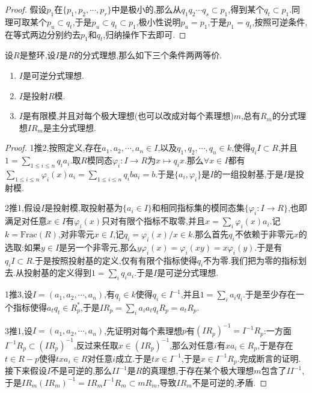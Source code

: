\begin{enumerate}
\begin{proof}
		假设$p_1$在$\{p_1,p_2,\cdots,p_r\}$中是极小的,那么从$q_1q_2\cdots q_s\subset p_1$,得到某个$q_t\subset p_1$.同理可取某个$p_u\subset q_t$,于是$p_u\subset q_t\subset p_1$,极小性说明$p_u=p_1$,于是$p_1=q_t$,按照可逆条件,在等式两边分别约去$p_1$和$q_t$,归纳操作下去即可.
	\end{proof}
\end{enumerate}

设$R$是整环,设$I$是$R$的分式理想,那么如下三个条件两两等价.
\begin{enumerate}
	\item $I$是可逆分式理想.
	\item $I$是投射$R$模.
	\item $I$是有限模,并且对每个极大理想(也可以改成对每个素理想)$m$,总有$R_m$的分式理想$IR_m$是主分式理想.
\end{enumerate}
\begin{proof}
	
	1推2,按照定义,存在$a_1,a_2,\cdots,a_n\in I$,以及$q_1,q_2,\cdots,q_n\in k$,使得$q_iI\subset R$,并且$1=\sum_{1\le i\le n}q_ia_i$.取$R$模同态$\varphi_i:I\to R$为$x\mapsto q_ix$.那么$\forall x\in I$都有$\sum_{1\le i\le n}\varphi_i(x)a_i=\sum_{1\le i\le n}q_iba_i=b$.于是$\{a_i,\varphi_i\}$是$I$的一组投射基,于是$I$是投射模.
	
	2推1,假设$I$是投射模,取投射基为$\{a_i\in I\}$和相同指标集的模同态集$\{\varphi_i:I\to R\}$,也即满足对任意$x\in I$有$\varphi_i(x)$只对有限个指标不取零,并且$x=\sum_i\varphi_i(x)a_i$.记$k=\mathrm{Frac}(R)$,对非零元$x\in I$,记$q_i=\varphi_i(x)/x\in k$.那么首先$q_i$不依赖于非零元$x$的选取:如果$y\in I$是另一个非零元,那么$y\varphi_i(x)=\varphi_i(xy)=x\varphi_i(y)$.于是有$q_iI\subset R$.于是按照投射基的定义,仅有有限个指标使得$q_i$不为零.我们把为零的指标划去.从投射基的定义得到$1=\sum_iq_ia_i$.于是$I$是可逆分式理想.
	
	1推3,设$I=(a_1,a_2,\cdots,a_n)$,有$q_i\in k$使得$q_i\in I^{-1}$,并且$1=\sum_ia_iq_i$.于是至少存在一个指标使得$a_tq_t\in R_p^*$,于是$IR_p=\sum_ia_ia_tq_tR_p=a_tR_p$.
	
	3推1,设$I=(a_1,a_2,\cdots,a_n)$,先证明对每个素理想$p$有$(IR_p)^{-1}=I^{-1}R_p$:一方面$I^{-1}R_p\subset(IR_p)^{-1}$,反过来任取$x\in(IR_p)^{-1}$,那么对任意$i$有$xa_i\in R_p$,于是存在$t\in R-p$使得$txa_i\in R$对任意$i$成立.于是$tx\in I^{-1}$,于是$x\in I^{-1}R_p$.完成断言的证明.接下来假设$I$不是可逆的,那么$II^{-1}$是$R$的真理想,于存在某个极大理想$m$包含了$II^{-1}$,于是$IR_m(IR_m)^{-1}=IR_mI^{-1}R_m\subset mR_m$,导致$IR_m$不是可逆的,矛盾.
\end{proof}

